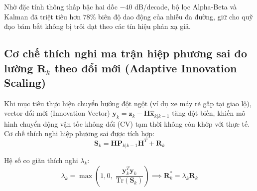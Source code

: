 Nhờ đặc tính thông thấp bậc hai dốc $-40$ dB/decade, bộ lọc Alpha-Beta và Kalman đã triệt tiêu hơn $78\%$ biên độ dao động của nhiễu đa đường, giữ cho quỹ đạo bám bắt không bị trôi dạt theo các tín hiệu phản xạ giả.

\subsection{Cơ chế thích nghi ma trận hiệp phương sai đo lường \texorpdfstring{$\mathbf{R}_k$}{Rk} theo đổi mới (Adaptive Innovation Scaling)}

\hspace{0.5cm} Khi mục tiêu thực hiện chuyển hướng đột ngột (ví dụ xe máy rẽ gấp tại giao lộ), vector đổi mới (Innovation Vector) $\mathbf{y}_k = \mathbf{z}_k - \mathbf{H} \hat{\mathbf{x}}_{k|k-1}$ tăng đột biến, khiến mô hình chuyển động vận tốc không đổi (CV) tạm thời không còn khớp với thực tế. Cơ chế thích nghi hiệp phương sai được tích hợp:
\begin{equation}
\mathbf{S}_k = \mathbf{H} \mathbf{P}_{k|k-1} \mathbf{H}^T + \mathbf{R}_k
\label{eq:innovation-covariance-formula}
\end{equation}

Hệ số co giãn thích nghi $\lambda_k$:
\begin{equation}
\lambda_k = \max\left(1{,}0, \; \frac{\mathbf{y}_k^T \mathbf{y}_k}{\text{Tr}(\mathbf{S}_k)}\right) \implies \mathbf{R}_k^* = \lambda_k \mathbf{R}_k
\label{eq:adaptive-r-scaling-formula}
\end{equation}

\begin{table}[H]
\centering
\caption{Hiệu quả của cơ chế thích nghi $\mathbf{R}_k$ khi xe máy rẽ gấp $90^\circ$ tại giao lộ}
\label{tab:adaptive-innovation-scaling-results}
\end{table}

